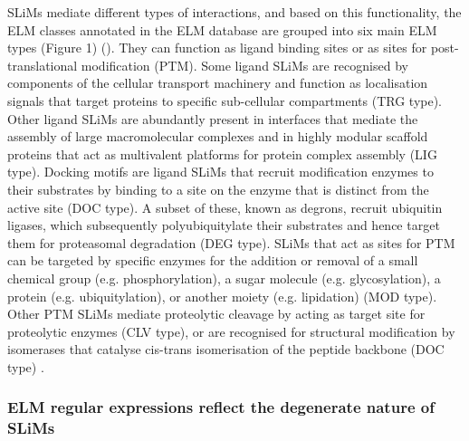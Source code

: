 SLiMs mediate different types of interactions, and based on this functionality, 
the ELM classes annotated in the ELM database are grouped into six main ELM 
types (Figure 1) (\cite{24214962}). They can function as ligand binding sites or 
as sites for post-translational modification (PTM). Some ligand SLiMs are 
recognised by components of the cellular transport machinery and function as 
localisation signals that target proteins to specific sub-cellular compartments 
(TRG type). Other ligand SLiMs are abundantly present in interfaces that mediate 
the assembly of large macromolecular complexes and in highly modular scaffold 
proteins that act as multivalent platforms for protein complex assembly 
(LIG type). Docking motifs are ligand SLiMs that recruit modification enzymes to 
their substrates by binding to a site on the enzyme that is distinct from the 
active site (DOC type). A subset of these, known as degrons, recruit ubiquitin 
ligases, which subsequently polyubiquitylate their substrates and hence target 
them for proteasomal degradation (DEG type). SLiMs that act as sites for PTM can 
be targeted by specific enzymes for the addition or removal of a small chemical 
group (e.g. phosphorylation), a sugar molecule (e.g. glycosylation), a protein 
(e.g. ubiquitylation), or another moiety (e.g. lipidation) (MOD type). Other PTM 
SLiMs mediate proteolytic cleavage by acting as target site for proteolytic 
enzymes (CLV type), or are recognised for structural modification by isomerases 
that catalyse cis-trans isomerisation of the peptide backbone (DOC type) 
\cite{24926813, 24773235}.

\subsubsection*{ELM regular expressions reflect the degenerate nature of SLiMs}

